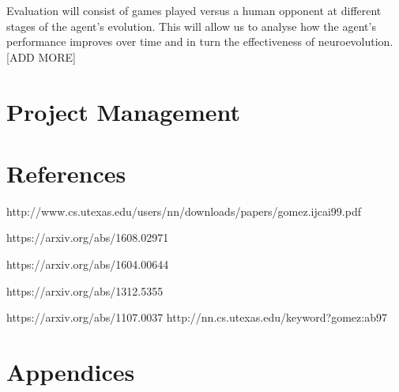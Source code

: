 \documentclass[12pt,a4paper]{article}
\begin{document}
Evaluation will consist of games played versus a human opponent at different stages of the agent's evolution. This will allow us to analyse how the agent's performance improves over time and in turn the effectiveness of neuroevolution.\\

[ADD MORE]

\newpage
\section{Project Management}

\section{References}

http://www.cs.utexas.edu/users/nn/downloads/papers/gomez.ijcai99.pdf

https://arxiv.org/abs/1608.02971

https://arxiv.org/abs/1604.00644

https://arxiv.org/abs/1312.5355

https://arxiv.org/abs/1107.0037
http://nn.cs.utexas.edu/keyword?gomez:ab97
\section{Appendices}
\end{document}
